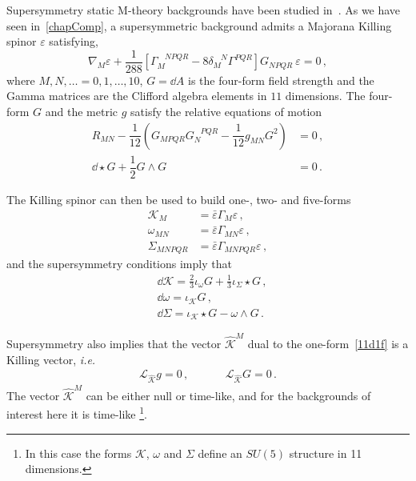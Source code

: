 \documentclass[debug]{phd}
\begin{document}
Supersymmetry static M-theory backgrounds have been studied in~\cite{GauntlettGeomKill}. 
As we have seen in~\cref{chapComp}, a supersymmetric background admits a Majorana Killing spinor $\varepsilon$ satisfying,
		\begin{equation}
			\nabla_M \varepsilon + \frac{1}{288} \left[ \Gamma_M^{\phantom{M}NPQR} - 8 \delta_M^{\phantom{M}N} \Gamma^{PQR} \right] G_{NPQR}\ \varepsilon =0 \, ,
		\end{equation}
where $M,N, \ldots = 0,1, \dots, 10$, $G= \dd  A $ is the four-form field strength and the Gamma matrices are the Clifford algebra elements in $11$ dimensions. 
The four-form $G$ and the metric $g$ satisfy the relative equations of motion
		\begin{align}
			R_{MN} - \dfrac{1}{12}\left( G_{MPQR}G_{N}^{\phantom{N}PQR} - \dfrac{1}{12}g_{MN} G^2 \right) &= 0 \, ,\\
			\dd  \star G + \dfrac{1}{2} G \wedge G &= 0\, .
		\end{align}
	
	The Killing spinor can then be used to build one-, two- and five-forms
	\begin{subequations}
		\label{11df}
			\begin{align}
				\label{11d1f}
				\mathcal{K}_M &= \bar{\varepsilon} \Gamma_M \varepsilon \, , \\
				\label{11d2f}
				\omega_{M N} &= \bar{\varepsilon} \Gamma_{M N} \varepsilon \, , \\
				\label{11d5f}
				\Sigma_{MNPQR} & = \bar{\varepsilon} \Gamma_{M N PQ R} \varepsilon \, , 
			\end{align}
	\end{subequations}
and the supersymmetry conditions imply that
%
	\begin{eqnarray}
		& \dd  \mathcal{K} = \frac{2}{3} \iota_\omega G + \frac{1}{3} \iota_\Sigma \star G \, , \\
		& \dd  \omega = \iota_\mathcal{K} G \, , \\
		& \dd  \Sigma = \iota_\mathcal{K} \star G - \omega \wedge G \, . 
	\end{eqnarray}

Supersymmetry also implies that the vector $\hat{\mathcal{K}}^M$ dual to the one-form~\eqref{11d1f} is a Killing vector, \emph{i.e.}
		\begin{equation}
			\begin{array}{ccc}
				\mathcal{L}_{\hat{\mathcal{K}}} g = 0\, , & \phantom{and} & \mathcal{L}_{\hat{\mathcal{K}}} G = 0 \, . 
			\end{array}
		\end{equation}	
	The vector $\hat{\mathcal{K}}^M$ can be either null or time-like, and for the backgrounds of interest here it is time-like%
		\footnote{%
			In this case the forms $\mathcal{K}$, $\omega$ and $\Sigma$ define an $SU(5)$ structure in 11 dimensions.%
		}.%
\end{document}
